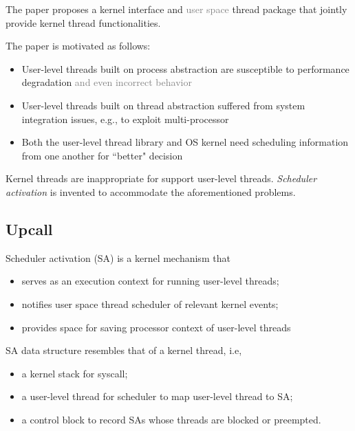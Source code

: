 
\begin{definition}
The paper proposes a kernel interface and \textcolor{gray}{user space} thread package that jointly provide kernel thread functionalities.
\end{definition}

The paper is motivated as follows:

\begin{itemize}
    \item User-level threads built on process abstraction are susceptible to performance degradation \textcolor{gray}{and even incorrect behavior}
    \item User-level threads built on thread abstraction suffered from system integration issues, e.g., to exploit multi-processor
    \item Both the user-level thread library and OS kernel need scheduling information from one another for ``better" decision
\end{itemize}

Kernel threads are inappropriate for support user-level threads. \textit{Scheduler activation} is invented to accommodate the aforementioned problems.

\subsection{Upcall}

\begin{definition}
Scheduler activation (SA) is a kernel mechanism that

\begin{itemize}
    \item serves as an execution context for running user-level threads;
    \item notifies user space thread scheduler of relevant kernel events;
    \item provides space for saving processor context of user-level threads
\end{itemize}
\end{definition}

SA data structure resembles that of a kernel thread, i.e,

\begin{itemize}
    \item a kernel stack for syscall;
    \item a user-level thread for scheduler to map user-level thread to SA;
    \item a control block to record SAs whose threads are blocked or preempted.
\end{itemize}


